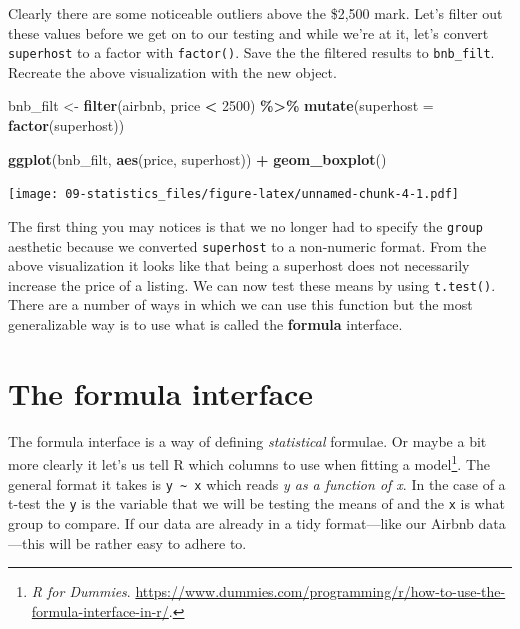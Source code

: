 \documentclass[
]{book}
\newenvironment{Shaded}{\begin{snugshade}}{\end{snugshade}}
\newcommand{\DataTypeTok}[1]{\textcolor[rgb]{0.13,0.29,0.53}{#1}}
\newcommand{\DecValTok}[1]{\textcolor[rgb]{0.00,0.00,0.81}{#1}}
\newcommand{\KeywordTok}[1]{\textcolor[rgb]{0.13,0.29,0.53}{\textbf{#1}}}
\newcommand{\NormalTok}[1]{#1}
\newcommand{\OperatorTok}[1]{\textcolor[rgb]{0.81,0.36,0.00}{\textbf{#1}}}
\newcommand{\StringTok}[1]{\textcolor[rgb]{0.31,0.60,0.02}{#1}}
\begin{document}
Clearly there are some noticeable outliers above the \$2,500 mark. Let's filter out these values before we get on to our testing and while we're at it, let's convert \texttt{superhost} to a factor with \texttt{factor()}. Save the the filtered results to \texttt{bnb\_filt}. Recreate the above visualization with the new object.

\begin{Shaded}
\begin{Highlighting}[]
\NormalTok{bnb\_filt \textless{}{-}}\StringTok{ }\KeywordTok{filter}\NormalTok{(airbnb, price }\OperatorTok{\textless{}}\StringTok{ }\DecValTok{2500}\NormalTok{) }\OperatorTok{\%\textgreater{}\%}\StringTok{ }
\StringTok{  }\KeywordTok{mutate}\NormalTok{(}\DataTypeTok{superhost =} \KeywordTok{factor}\NormalTok{(superhost))}

\KeywordTok{ggplot}\NormalTok{(bnb\_filt, }\KeywordTok{aes}\NormalTok{(price, superhost)) }\OperatorTok{+}
\StringTok{  }\KeywordTok{geom\_boxplot}\NormalTok{()}
\end{Highlighting}
\end{Shaded}

\texttt{[image: 09-statistics\_files/figure-latex/unnamed-chunk-4-1.pdf]}

The first thing you may notices is that we no longer had to specify the \texttt{group} aesthetic because we converted \texttt{superhost} to a non-numeric format. From the above visualization it looks like that being a superhost does not necessarily increase the price of a listing. We can now test these means by using \texttt{t.test()}. There are a number of ways in which we can use this function but the most generalizable way is to use what is called the \textbf{formula} interface.

\hypertarget{the-formula-interface}{%
\section{The formula interface}\label{the-formula-interface}}

The formula interface is a way of defining \emph{statistical} formulae. Or maybe a bit more clearly it let's us tell R which columns to use when fitting a model\footnote{\emph{R for Dummies}. \url{https://www.dummies.com/programming/r/how-to-use-the-formula-interface-in-r/}.}. The general format it takes is \texttt{y\ \textasciitilde{}\ x} which reads \emph{y as a function of x}. In the case of a t-test the \texttt{y} is the variable that we will be testing the means of and the \texttt{x} is what group to compare. If our data are already in a tidy format---like our Airbnb data---this will be rather easy to adhere to.
\end{document}
